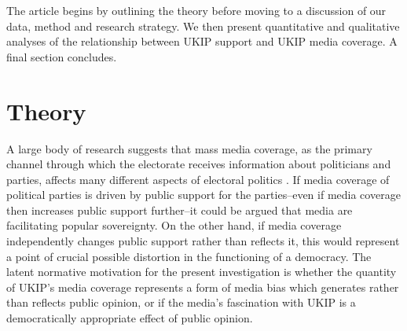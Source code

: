 \documentclass[12pt,]{article}
\begin{document}
The article begins by outlining the theory before moving to a discussion
of our data, method and research strategy. We then present quantitative
and qualitative analyses of the relationship between UKIP support and
UKIP media coverage. A final section concludes.

\section{Theory}\label{theory}

A large body of research suggests that mass media coverage, as the
primary channel through which the electorate receives information about
politicians and parties, affects many different aspects of electoral
politics
\citep{norris_virtuous_2000, paletz_political_1996, beck_social_2002, dalton_partisan_1998}.
If media coverage of political parties is driven by public support for
the parties--even if media coverage then increases public support
further--it could be argued that media are facilitating popular
sovereignty. On the other hand, if media coverage independently changes
public support rather than reflects it, this would represent a point of
crucial possible distortion in the functioning of a democracy. The
latent normative motivation for the present investigation is whether the
quantity of UKIP's media coverage represents a form of media bias which
generates rather than reflects public opinion, or if the media's
fascination with UKIP is a democratically appropriate effect of public
opinion.
\end{document}
